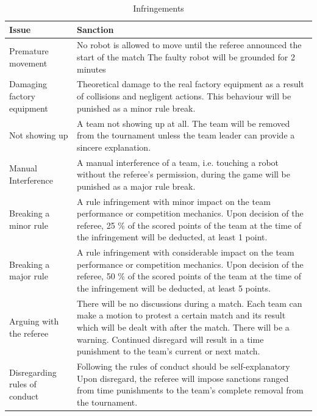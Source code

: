 \documentclass[12pt,twoside]{article}
\begin{document}
\begin{table}[thpb]
  \centering
  \begin{tabularx}{\linewidth}{l|X}
  \multicolumn{1}{l}{Issue} &\multicolumn{1}{l}{Sanction}\\\hline
  Premature movement & No robot is allowed to move until the referee
  announced the start of the match The faulty robot will be grounded
  for
  2 minutes\\[1ex]
%
  Damaging factory equipment & Theoretical damage to the real
  factory equipment as a result of collisions and negligent actions.
  This behaviour will be punished as a minor rule break.\\[1ex]
%
  Not showing up & A team not showing up at all. The team will be
  removed from the tournament unless the team leader can provide a
  sincere explanation.\\[1ex]
%
  Manual Interference & A manual interference of a team, i.e. touching
  a robot without the referee's permission, during the game will be
  punished as a major rule break.\\[1ex]
%
  Breaking a minor rule & A rule infringement with minor impact on the
  team performance or competition mechanics. Upon decision of
  the referee, 25 \% of the scored points of the team at the time of
  the infringement will be deducted, at least 1 point.\\[1ex]
  Breaking a major rule & A rule infringement with considerable impact
  on the team performance or competition mechanics. Upon decision of
  the referee, 50 \% of the scored points of the team at the time of
  the infringement will be deducted, at least 5 points. \\[1ex]
  Arguing with the referee & There will be no discussions during a
  match. Each team can make a motion to protest a certain match and
  its result which will be dealt with after the match. There will be a
  warning. Continued disregard will result in a time punishment to the
  team's current or next match.\\[1ex]
%
  Disregarding rules of conduct & Following the rules of conduct
  should be self-explanatory Upon disregard, the referee will impose
  sanctions ranged from time punishments to the team's complete
  removal from the tournament.\\\hline
  \end{tabularx}  
  \caption{Infringements}
  \label{tab:infringements}
\end{table}
\end{document}
